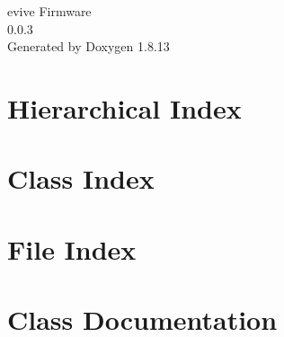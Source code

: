 \documentclass[twoside]{book}
\newcommand{\+}{\discretionary{\mbox{\scriptsize$\hookleftarrow$}}{}{}}
\newcommand{\clearemptydoublepage}{%
  \newpage{\pagestyle{empty}\cleardoublepage}%
}
\begin{document}
\hypersetup{pageanchor=false,
             bookmarksnumbered=true,
             pdfencoding=unicode
            }
\begin{titlepage}
\vspace*{7cm}
\begin{center}%
{\Large evive Firmware \\[1ex]\large 0.\+0.\+3 }\\
\vspace*{1cm}
{\large Generated by Doxygen 1.8.13}\\
\end{center}
\end{titlepage}
\clearemptydoublepage
{}
\tableofcontents
\clearemptydoublepage
{}
\hypersetup{pageanchor=true}

\chapter{Hierarchical Index}

\chapter{Class Index}

\chapter{File Index}

\chapter{Class Documentation}














\end{document}
